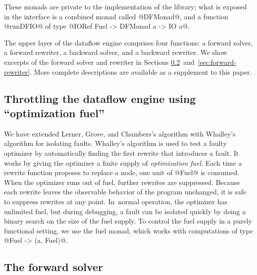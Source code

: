 \documentclass[blockstyle,preprint,natbib,nocopyrightspace]{sigplanconf}
\newcommand{\authornote}[1]{{\em #1}}
\def\authornote#1{\unskip\relax}
\newcommand{\norman}[1]{\authornote{NR: #1}}
\let\remark\norman
\newcommand\secreftwo[2]{Sections \ref{sec:#1}~and~\ref{sec:#2}}
\newcommand\seclabel[1]{\label{sec:#1}}
\begin{document}
These monads are private to the implementation of the library;
what is exposed in the interface is a combined monad called @DFMonad@, and a function
@runDFIO@ of type @IORef Fuel -> DFMonad a -> IO a@.
\remark{Unfortunately, this is the first mention of @Fuel@}

The upper layer of the dataflow engine comprises four functions:
a forward solver, a forward rewriter,
a backward solver, and a backward rewriter.
We show excerpts of the forward solver and rewriter in
\secreftwo{forward-solver}{forward-rewriter}. 
More complete descriptions are available as a supplement to this
paper. 



\subsection{Throttling the dataflow engine using ``optimization
  fuel''}

\seclabel{vpoiso}

We have extended Lerner, Grove, and Chambers's algorithm with
Whalley's \citeyearpar{whalley:isolation} algorithm for isolating
faults.
Whalley's algorithm is used to test a faulty optimizer by automatically
finding the first rewrite that introduces a fault.
It works by giving the optimizer a finite supply of \emph{optimization
fuel}.
Each time a rewrite function proposes to replace a node, one unit of @Fuel@ is
consumed.
When the optimizer runs out of fuel, further rewrites are suppressed.
Because each rewrite leaves the observable behavior of the
program unchanged, it is safe to suppress rewrites at
any point.
In~normal operation, the optimizer has unlimited fuel, but during
debugging, a fault can be isolated quickly by doing a binary search on
the size of the fuel supply.
To control the fuel supply in a purely functional setting, we use
the fuel monad, which works with
computations of type @Fuel -> (a, Fuel)@.


\subsection{The forward solver}

\seclabel{forward-solver}
\end{document}
